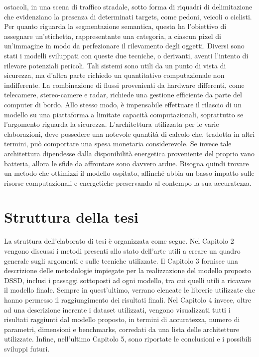ostacoli, in una scena di traffico stradale, sotto forma di riquadri di delimitazione 
che evidenziano la presenza di determinati targets, come pedoni, 
veicoli o ciclisti. Per quanto riguarda la segmentazione semantica, questa ha 
l'obiettivo di assegnare un'etichetta, rappresentante una categoria, a ciascun 
pixel di un'immagine in modo da perfezionare il rilevamento degli oggetti. 
Diversi sono stati i modelli sviluppati con queste due tecniche, o derivanti, 
aventi l'intento di rilevare potenziali pericoli. Tali sistemi sono utili da 
un punto di vista di sicurezza, ma d'altra parte richiedo un quantitativo 
computazionale non indifferente. La combinazione di flussi provenienti da 
hardware differenti, come telecamere, stereo-camere e radar, richiede 
una gestione efficiente da parte del computer di bordo. Allo stesso modo, è 
impensabile effettuare il rilascio di un modello su una piattaforma a limitate 
capacità computazionali, soprattutto se l'argomento riguarda la sicurezza. 
L'architettura utilizzata per le varie elaborazioni, deve possedere una notevole 
quantità di calcolo che, tradotta in altri termini, può comportare 
una spesa monetaria considerevole. Se invece tale architettura dipendesse dalla 
disponibilità energetica proveniente del proprio vano batteria, allora le sfide 
da affrontare sono davvero ardue. Bisogna quindi trovare un metodo che 
ottimizzi il modello ospitato, affinché abbia un basso impatto sulle risorse 
computazionali e energetiche preservando al contempo la sua accuratezza.

\section{Struttura della tesi}
La struttura dell'elaborato di tesi è organizzata come segue. Nel Capitolo 
2 vengono discussi i metodi presenti allo stato dell'arte utili a creare 
un quadro generale sugli argomenti e sulle tecniche utilizzate. Il Capitolo 3 
fornisce una descrizione delle metodologie impiegate per la realizzazione 
del modello proposto DSSD, inclusi i passaggi sottoposti ad ogni modello, 
tra cui quelli utili a ricavare il modello finale. Sempre in quest'ultimo, 
verrano elencate le librerie utilizzate che hanno permesso il raggiungimento 
dei risultati finali. Nel Capitolo 4 invece, oltre ad una descrizione inerente i 
dataset utilizzati, vengono visualizzati tutti i risultati raggiunti dal modello 
proposto, in termini di accuratezza, numero di parametri, dimensioni e 
benchmarks, corredati da una lista delle architetture utilizzate. Infine, 
nell'ultimo Capitolo 5, sono riportate le conclusioni e i possibili sviluppi 
futuri. 